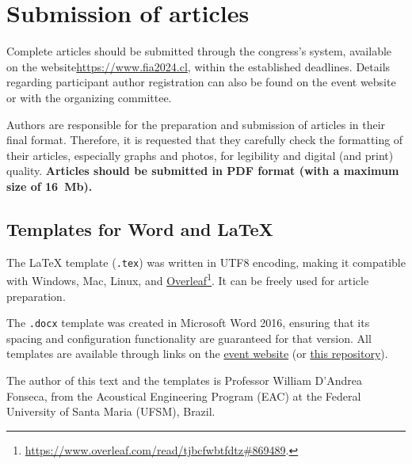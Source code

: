 \section{Submission of articles}

Complete articles should be submitted through the congress's system, available on the website\linebreak \url{https://www.fia2024.cl}, within the established deadlines. Details regarding participant author registration can also be found on the event website or with the organizing committee.

Authors are responsible for the preparation and submission of articles in their final format. Therefore, it is requested that they carefully check the formatting of their articles, especially graphs and photos, for legibility and digital (and print) quality. \textbf{Articles should be submitted in PDF format (with a maximum size of 16~Mb).}




\subsection{Templates for Word and \LaTeX}

The \LaTeX\xspace template (\texttt{.tex}) was written in UTF8 encoding, making it compatible with Windows, Mac, Linux, and \href{https://www.overleaf.com/read/tjbcfwbtfdtz\#869489}{Overleaf}\footnote{\url{https://www.overleaf.com/read/tjbcfwbtfdtz\#869489}.}. It can be freely used for article preparation.

The \texttt{.docx} template was created in Microsoft Word 2016, ensuring that its spacing and configuration functionality are guaranteed for that version. All templates are available through links on the \href{https://www.fia2024.cl}{event website} (or \href{https://github.com/willdfonseca/latex}{this repository}).

The author of this text and the templates is Professor William D'Andrea Fonseca, from the Acoustical Engineering Program (EAC) at the Federal University of Santa Maria (UFSM), Brazil.

